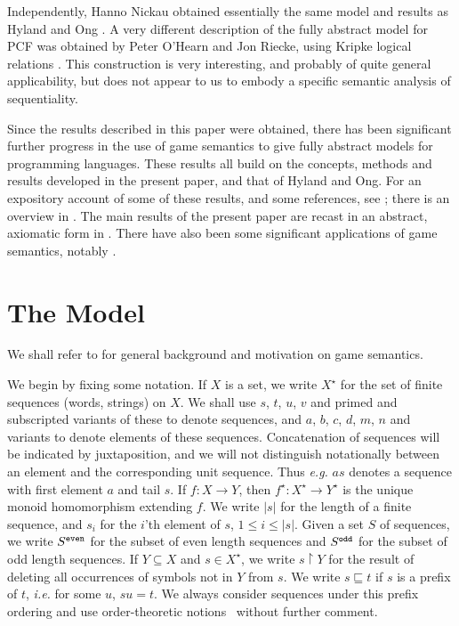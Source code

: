 \documentclass[11pt]{article}
\newcommand{\even}[1]{\mbox{$#1^{\tt even}$}}
\newcommand{\odd}[1]{\mbox{$#1^{\tt odd}$}}
\begin{document}
Independently, Hanno Nickau obtained essentially the same model and results
as Hyland and Ong \cite{NickauH:hersf}. A very different description
of the fully abstract 
model for PCF was obtained by Peter O'Hearn and Jon Riecke, using Kripke logical
relations \cite{OHearnPW:krilrp}. This construction is very
interesting, and probably 
of quite general applicability, but does not appear to us to embody a
specific semantic analysis of sequentiality.

Since the results described in this paper were obtained, there has
been significant further progress in the use of game semantics to give
fully abstract models for programming languages. 
These results all build on the concepts, methods and results developed
in the present paper, and that of Hyland and Ong. For an expository account of 
some of these results, and some references,
see \cite{AM97}; there is an overview in \cite{Abr97}.
The main results of the present paper are recast in an abstract,
axiomatic form in \cite{Abr00}.
There have also been some
significant applications of game semantics, notably \cite{MH99,GM00}.


\section{The Model}
We shall refer to
\cite{AbramskyS:gamfcm} for general background and motivation on game semantics.

We begin by fixing some notation.  If $X$ is a set, we write
$X^{\star}$ for the set of finite sequences (words, strings) on $X$.
We shall use $s$, $t$, $u$, $v$  and primed and subscripted variants
of these to denote sequences, and $a$, $b$, $c$, $d$, $m$, $n$ and
variants to denote
elements of these sequences. Concatenation of sequences will be indicated
by juxtaposition, and we will not distinguish notationally between an element
and the corresponding unit sequence. Thus {\sl e.g.} $as$ denotes a sequence
with first element $a$  and tail $s$.
If $f: X
\rightarrow Y$, then $f^{\star}: X^{\star} \rightarrow Y^{\star}$ is
the unique monoid homomorphism extending $f$.  We write $|s|$ for the
length of a finite sequence, and $s_i$ for the $i$'th element of $s$,
$1\leq i\leq |s|$.
Given a set $S$ of sequences, we write
\even{S} for the subset of even length sequences and \odd{S} for the
subset of odd length sequences.  If $Y \subseteq X$ and $s \in
X^{\star}$, we write $s {\upharpoonright} Y$ for the result of
deleting all occurrences of symbols not in $Y$ from $s$.
We write $ s
\sqsubseteq t$ if $s$ is a prefix of $t$, {\em i.e.} for some $u$, $s u
= t$.  We always consider sequences under this prefix ordering and use
order-theoretic notions~\cite{DaveyBA:Intlor} without further comment.
\end{document}
